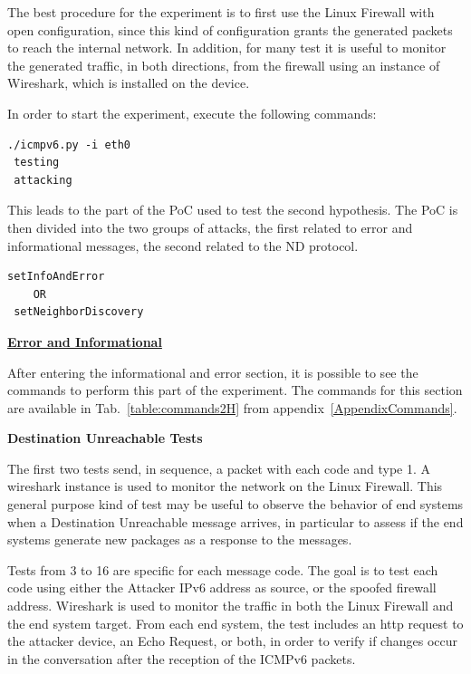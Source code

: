 \documentclass[12pt]{article}
\begin{document}
The best procedure for the experiment is to first use the Linux Firewall with open configuration, since this kind of configuration grants the generated packets to reach the internal network. In addition, for many test it is useful to monitor the generated traffic, in both directions, from the firewall using an instance of Wireshark, which is installed on the device.

In order to start the experiment, execute the following commands:

\begin{lstlisting}[style=python,basicstyle=\ttfamily\small]
 ./icmpv6.py -i eth0
 testing
 attacking
\end{lstlisting}
\vspace{-15pt}
This leads to the part of the PoC used to test the second hypothesis. The PoC is then divided into the two groups of attacks, the first related to error and informational messages, the second related to the ND protocol. 
\begin{lstlisting}[style=python,basicstyle=\ttfamily\small]
 setInfoAndError
    OR
 setNeighborDiscovery
\end{lstlisting}

\textbf{\underline{Error and Informational}}

After entering the informational and error section, it is possible to see the commands to perform this part of the experiment. The commands for this section are available in Tab.~\ref{table:commands2H} from appendix~\ref{AppendixCommands}. 

\textbf{Destination Unreachable Tests}

The first two tests send, in sequence, a packet with each code and type 1. A wireshark instance is used to monitor the network on the Linux Firewall. This general purpose kind of test may be useful to observe the behavior of end systems when a Destination Unreachable message arrives, in particular to assess if the end systems generate new packages as a response to the messages.

Tests from 3 to 16 are specific for each message code. The goal is to test each code using either the Attacker IPv6 address as source, or the spoofed firewall address. Wireshark is used to monitor the traffic in both the Linux Firewall and the end system target. From each end system, the test includes an http request to the attacker device, an Echo Request, or both, in order to verify if changes occur in the conversation after the reception of the ICMPv6 packets.
\end{document}
